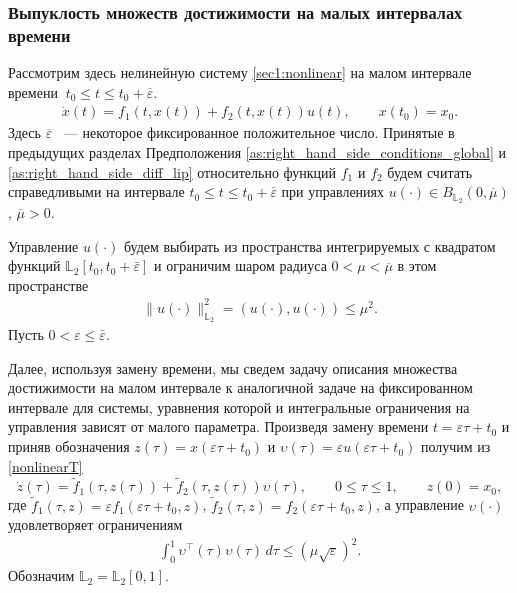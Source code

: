 \documentclass[../main.tex]{subfiles}
\begin{document}
    \subsubsection{Выпуклость множеств достижимости на малых интервалах времени}
    Рассмотрим здесь нелинейную систему \eqref{sec1:nonlinear} на малом интервале времени $\ t_0 \leqslant t \leqslant t_0 + \overline{\varepsilon} $.
    \begin{gather}\label{nonlinearT}
			\dot{x}(t)=f_1(t,x(t))+f_2(t,x(t))u(t), \qquad x(t_0) = x_0.
	\end{gather}
    Здесь $ \overline{\varepsilon} $ ~--- некоторое фиксированное положительное число. Принятые в предыдущих разделах Предположения \ref{as:right_hand_side_conditions_global} и \ref{as:right_hand_side_diff_lip} относительно функций $f_1$ и $f_2$ будем считать справедливыми на интервале $t_0 \leqslant t \leqslant t_0 + \overline{\varepsilon} $ при управлениях $u(\cdot) \in B_{\mathbb{L}_2}(0, \overline{\mu}) $, $\overline{\mu} > 0$.
   

     Управление $u(\cdot)$ будем выбирать из
    пространства интегрируемых с квадратом функций $\mathbb{L}_2[t_0,t_0+\bar{\varepsilon}]$ и ограничим шаром радиуса $  0 < \mu < \overline{\mu} $ в этом пространстве
    \begin{gather*}
    	\lVert u(\cdot)\rVert^2_{\mathbb{L}_2} = \left(u(\cdot),u(\cdot) \right) \leqslant \mu^2.
    \end{gather*}
	Пусть $ 0 <  \varepsilon \leqslant \bar{\varepsilon} $.  
	
	Далее, используя замену времени, мы сведем задачу описания множества достижимости на малом интервале к аналогичной задаче на фиксированном интервале для системы, уравнения которой и интегральные ограничения на управления зависят от малого параметра.
    Произведя замену времени
    $ t = \varepsilon \tau + t_0 $ и приняв обозначения $ z(\tau) = x(\varepsilon \tau + t_0) $ и $ \upsilon(\tau) = \varepsilon u(\varepsilon \tau + t_0) $  получим из \eqref{nonlinearT}
        \begin{equation}\label{epsnonlinear}
    	\dot{z}(\tau)=\widetilde{f}_1(\tau,z(\tau))+\widetilde{f}_2(\tau,z(\tau))\upsilon(\tau), \qquad 0 \leqslant \tau \leqslant 1, \qquad z(0) = x_0,
    \end{equation}
    где $ \widetilde{f}_1(\tau,z) = \varepsilon f_1(\varepsilon \tau + t_0,z) $, $ \widetilde{f}_2 (\tau,z) = f_2(\varepsilon \tau + t_0,z)$, а управление $ \upsilon(\cdot) $ удовлетворяет ограничениям
    \begin{gather}\label{epscond}
    	\int_0^1 \upsilon^{\top}(\tau) \upsilon(\tau) \, d\tau \leqslant \left( \mu \sqrt{\varepsilon}\right)^2.
    \end{gather}
    Обозначим $\mathbb{L}_2 = \mathbb{L}_2[0, 1]$. 
    
\end{document}
